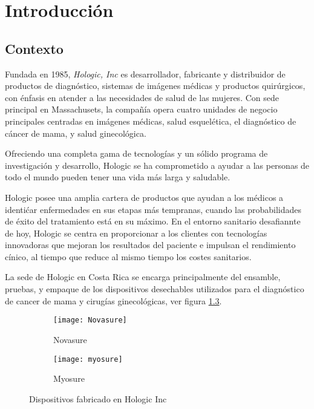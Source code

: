 
\chapter{Introducci\'on}
\label{chp:intro}


\section{Contexto}

Fundada en 1985, \emph{Hologic, Inc} es desarrollador, fabricante
y distribuidor de productos de diagn\'ostico, sistemas de im\'agenes
m\'edicas y productos quir\'urgicos, con \'enfasis en atender a las necesidades de salud de las mujeres.
Con sede principal en Massachusets, la compa\~n\'ia opera cuatro unidades de negocio principales centradas en im\'agenes m\'edicas,
salud esquel\'etica, el diagn\'ostico de c\'ancer de mama, y salud ginecol\'ogica. 

Ofreciendo una completa gama de tecnolog\'ias y un s\'olido programa de investigaci\'on y desarrollo, Hologic
se ha comprometido a ayudar a las personas de todo el mundo pueden tener una vida m\'as
larga y saludable. \par

Hologic posee una amplia cartera de productos que ayudan a los m\'edicos a identi\'car
enfermedades en sus etapas m\'as tempranas, cuando las probabilidades de \'exito del tratamiento
est\'a en su m\'aximo. En el entorno sanitario desafiannte de hoy, Hologic se centra
en proporcionar a los clientes con tecnolog\'ias innovadoras que mejoran los resultados del
paciente e impulsan el rendimiento c\'inico, al tiempo que reduce al mismo tiempo los
costes sanitarios. \par

La sede de Hologic en Costa Rica se encarga principalmente del ensamble, pruebas, y
empaque de los dispositivos desechables utilizados para el diagn\'ostico de cancer de mama
y cirug\'ias ginecol\'ogicas, ver figura \ref{fig:Novasure}.

\begin{figure}[ht]
    \centering
    \begin{subfigure}[b]{0.45\textwidth}
        \centering
        \texttt{[image: Novasure]}
        \caption{Novasure}
        \label{fig:nova}
    \end{subfigure}
    \hfill
    \begin{subfigure}[b]{0.45\textwidth}
        \centering
        \texttt{[image: myosure]}
        \caption{Myosure}
        \label{fig:myo}
    \end{subfigure}
    \caption{Dispositivos fabricado en Hologic Inc}
    \label{fig:Novasure}
\end{figure}


